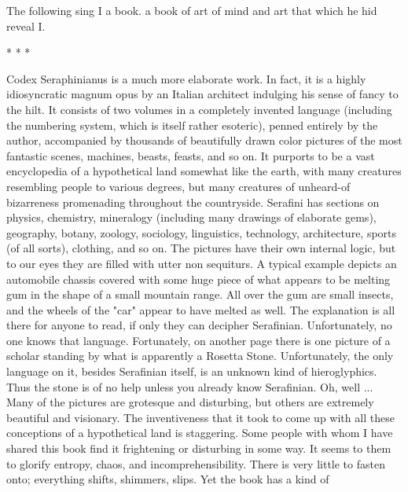                                 The following sing I a book.
                                        a book of art
                                      of mind and art
                                     that which he hid
                                          reveal I.





                                          *   *   *

        Codex Seraphinianus is a much more elaborate work. In fact, it is a highly
idiosyncratic magnum opus by an Italian architect indulging his sense of fancy to the hilt.
It consists of two volumes in a completely invented language (including the numbering
system, which is itself rather esoteric), penned entirely by the author, accompanied by
thousands of beautifully drawn color pictures of the most fantastic scenes, machines,
beasts, feasts, and so on. It purports to be a vast encyclopedia of a hypothetical land
somewhat like the earth, with many creatures resembling people to various degrees, but
many creatures of unheard-of bizarreness promenading throughout the countryside.
Serafini has sections on physics, chemistry, mineralogy (including many drawings of
elaborate gems), geography, botany, zoology, sociology, linguistics, technology,
architecture, sports (of all sorts), clothing, and so on. The pictures have their own internal
logic, but to our eyes they are filled with utter non sequiturs.
        A typical example depicts an automobile chassis covered with some huge piece of
what appears to be melting gum in the shape of a small mountain range. All over the gum
are small insects, and the wheels of the "car" appear to have melted as well. The
explanation is all there for anyone to read, if only they can decipher Serafinian.
Unfortunately, no one knows that language. Fortunately, on another page there is one
picture of a scholar standing by what is apparently a Rosetta Stone. Unfortunately, the
only language on it, besides Serafinian itself, is an unknown kind of hieroglyphics. Thus
the stone is of no help unless you already know Serafinian. Oh, well ... Many of the
pictures are grotesque and disturbing, but others are extremely beautiful and visionary.
The inventiveness that it took to come up with all these conceptions of a hypothetical
land is staggering.
        Some people with whom I have shared this book find it frightening or disturbing
in some way. It seems to them to glorify entropy, chaos, and incomprehensibility. There
is very little to fasten onto; everything shifts, shimmers, slips. Yet the book has a kind of
